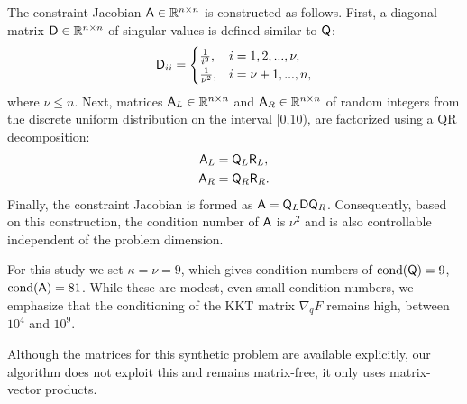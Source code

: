 The constraint Jacobian $\mathsf{A} \in \mathbb{R}^{n\times n}$ is constructed as follows. First, a diagonal matrix 
$\mathsf{D} \in \mathbb{R}^{n\times n}$ of singular values is defined similar to $\mathsf{Q}$:
\begin{equation*}
  \mathsf{D}_{ii} = \begin{cases}
    \frac{1}{i^2}, &  i = 1,2,...,\nu, \\
    \frac{1}{\nu^2}, & i = \nu+1, ..., n, \\
  \end{cases}
\end{equation*}
where $\nu \leq n$.  Next, matrices $\mathsf{A}_L  \in \mathbb{R}^{n\times n} $ and $\mathsf{A}_R \in \mathbb{R}^{n\times n}$ of random integers from 
the discrete uniform distribution on the
interval [0,10),  are factorized using a QR decomposition:  
\begin{equation*}
\begin{aligned}
\mathsf{A}_L &= \mathsf{Q}_L \mathsf{R}_L, \\
\mathsf{A}_R &= \mathsf{Q}_R \mathsf{R}_R. \\
\end{aligned}
\end{equation*}
Finally, the constraint Jacobian is formed as $\mathsf{A} =\mathsf{Q}_L  \mathsf{D} \mathsf{Q}_R $.  
Consequently, based on this construction, the condition number of $\mathsf{A}$ is $\nu ^2$ and is also controllable independent of the problem dimension.

For this study we set $\kappa = \nu = 9$, which gives condition numbers of  
$ \text{cond} (\mathsf{Q} )= 9$,  $ \text{cond} (\mathsf{A}) = 81$. 
While these are modest, even small condition numbers, we emphasize that the conditioning of the KKT matrix $\nabla_q F$ remains high, between $10^4$ and $10^9$.



\begin{remark}
Although the matrices for this synthetic problem are available explicitly, our
algorithm does not exploit this and remains matrix-free, \ie it only uses
matrix-vector products.
\end{remark}

